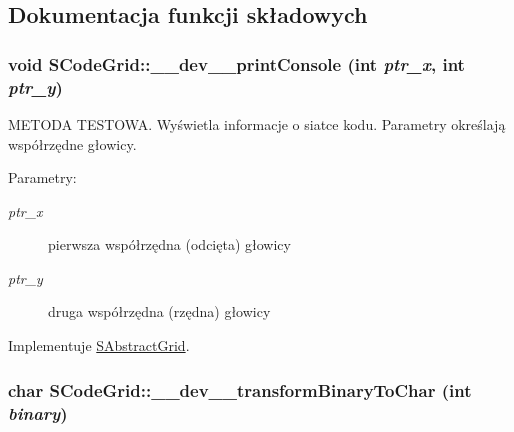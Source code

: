 \subsection{Dokumentacja funkcji składowych}
\hypertarget{classSCodeGrid_c01feeae87539b97aed07d67b975f174}{
\subsubsection[{\_\-\_\-dev\_\-\_\-printConsole}]{\setlength{\rightskip}{0pt plus 5cm}void SCodeGrid::\_\-\_\-dev\_\-\_\-printConsole (int {\em ptr\_\-x}, \/  int {\em ptr\_\-y})}}
\label{classSCodeGrid_c01feeae87539b97aed07d67b975f174}


METODA TESTOWA. Wyświetla informacje o siatce kodu. Parametry określają współrzędne głowicy. \begin{Desc}
\item[Parametry:]
\begin{description}
\item[{\em ptr\_\-x}]pierwsza współrzędna (odcięta) głowicy \item[{\em ptr\_\-y}]druga współrzędna (rzędna) głowicy \end{description}
\end{Desc}


Implementuje \hyperlink{classSAbstractGrid_e36c03b21a96f33d1ace5fd0b1d218f5}{SAbstractGrid}.\hypertarget{classSCodeGrid_75d1d340ee3c5704527e793f2e71e93b}{
\subsubsection[{\_\-\_\-dev\_\-\_\-transformBinaryToChar}]{\setlength{\rightskip}{0pt plus 5cm}char SCodeGrid::\_\-\_\-dev\_\-\_\-transformBinaryToChar (int {\em binary})}}
\label{classSCodeGrid_75d1d340ee3c5704527e793f2e71e93b}


